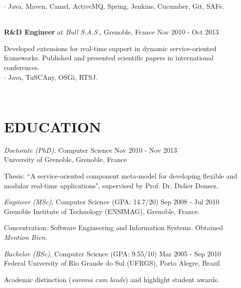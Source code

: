\documentclass[margin]{res}
\begin{document}
\begin{resume}
\begin{small}
		                 {\color{gray} $\cdot$ Java, Maven, Camel, ActiveMQ, Spring, Jenkins, Cucumber, Git, SAFe.}
        	         	\end{small}
	              	\vspace{1mm}\\
			\textbf{R\&D Engineer} at {\sl Bull S.A.S.}, Grenoble, France \hfill Nov 2010 - Oct 2013\\
                 	\begin{small}              
                 		{\color{darkgray} Developed extensions for real-time support in dynamic service-oriented frameworks. Published and presented scientific papers in international conferences.}\\
			         {\color{gray} $\cdot$ Java, TuSCAny, OSGi, RTSJ.}
        		         \end{small}
               		\vspace{1mm}\\
		\vspace{-8mm}
		\section{EDUCATION} {\sl Doctorate (PhD),} Computer Science \hfill Nov 2010 - Nov 2013\\
               		University of Grenoble, Grenoble, France\\
	   		\begin{small}
        	        			{\color{darkgray} Thesis: ``A service-oriented component meta-model for developing flexible and modular real-time applications", supervised by Prof. Dr. Didier Donsez.}
				\vspace{1.5mm}\\                 	            
			\end{small}  	            
        		        {\sl Engineer (MSc),} Computer Science (GPA: 14.7/20) \hfill Sep 2008 - Jul 2010\\
               		Grenoble Institute of Technology (ENSIMAG), Grenoble, France.\\
	               	 \begin{small}
        		       		{\color{darkgray} Concentration: Software Engineering and Information Systems. Obtained \textit{Mention Bien}.}
				\vspace{1.5mm}\\
	               	\end{small}
        		        {\sl Bachelor (BSc),} Computer Science (GPA: 9.55/10) \hfill Mar 2005 - Sep 2010\\
                		Federal University of Rio Grande do Sul (UFRGS), Porto Alegre, Brazil\\
	               	\begin{small}
        		       		{\color{darkgray} Academic distinction (\textit{summa cum laude}) and highlight student awards.}
				\vspace{1.5mm}\\
	               	\end{small}
		\vspace{-8mm}

\end{resume}
\end{document}
